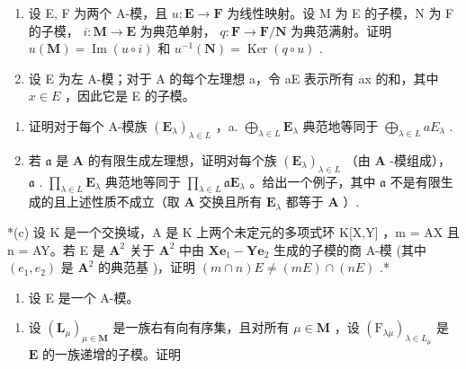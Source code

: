 \BourbakiExercisesSection

\begin{enumerate}
\def\labelenumi{\arabic{enumi}.}
\item
  设 E, F 为两个 A-模，且 \(u: \mathbf{E} \to \mathbf{F}\) 为线性映射。设 M 为 E 的子模，N 为 F 的子模， \(i: \mathbf{M} \to \mathbf{E}\) 为典范单射， \(q: \mathbf{F} \to \mathbf{F} / \mathbf{N}\) 为典范满射。证明 \(u(\mathbf{M}) = \operatorname{Im}(u \circ i)\) 和 \(u^{-1}(\mathbf{N}) = \operatorname{Ker}(q \circ u)\) .
\item
  设 E 为左 A-模；对于 A 的每个左理想 a，令 aE 表示所有 ax 的和，其中 \(x \in E\) ，因此它是 E 的子模。
\end{enumerate}

\begin{enumerate}
\def\labelenumi{(\alph{enumi})}
\item
  证明对于每个 A-模族 \((\mathbf{E}_{\lambda})_{\lambda \in L}\) ，a. \(\bigoplus_{\lambda \in L} \mathbf{E}_{\lambda}\) 典范地等同于 \(\bigoplus_{\lambda \in L} a E_{\lambda}\) .
\item
  若 \(\mathfrak{a}\) 是 \(\mathbf{A}\) 的有限生成左理想，证明对每个族 \((\mathbf{E}_{\lambda})_{\lambda \in L}\) （由 \(\mathbf{A}\) -模组成）， \(\mathfrak{a}\) . \(\prod_{\lambda \in L} \mathbf{E}_{\lambda}\) 典范地等同于 \(\prod_{\lambda \in L} \mathfrak{a}\mathbf{E}_{\lambda}\) 。给出一个例子，其中 \(\mathfrak{a}\) 不是有限生成的且上述性质不成立（取 \(\mathbf{A}\) 交换且所有 \(\mathbf{E}_{\lambda}\) 都等于 \(\mathbf{A}\) ）.
\end{enumerate}

*(c) 设 K 是一个交换域，A 是 K 上两个未定元的多项式环 K{[}X,Y{]} ，m = AX 且 n = AY。若 E 是 \(\mathbf{A}^2\) 关于 \(\mathbf{A}^2\) 中由 \(\mathbf{Xe}_1 - \mathbf{Ye}_2\) 生成的子模的商 A-模 (其中 \((e_1, e_2)\) 是 \(\mathbf{A}^2\) 的典范基 )，证明 \((m \cap n)E \neq (mE) \cap (nE)\) .*

\begin{enumerate}
\def\labelenumi{\arabic{enumi}.}
\setcounter{enumi}{2}
\tightlist
\item
  设 E 是一个 A-模。
\end{enumerate}

\begin{enumerate}
\def\labelenumi{(\alph{enumi})}
\tightlist
\item
  设 \((\mathbf{L}_{\mu})_{\mu \in \mathbf{M}}\) 是一族右有向有序集，且对所有 \(\mu \in \mathbf{M}\) ，设 \((\mathrm{F}_{\lambda \mu})_{\lambda \in L_{\mu}}\) 是 \(\mathbf{E}\) 的一族递增的子模。证明
\end{enumerate}


